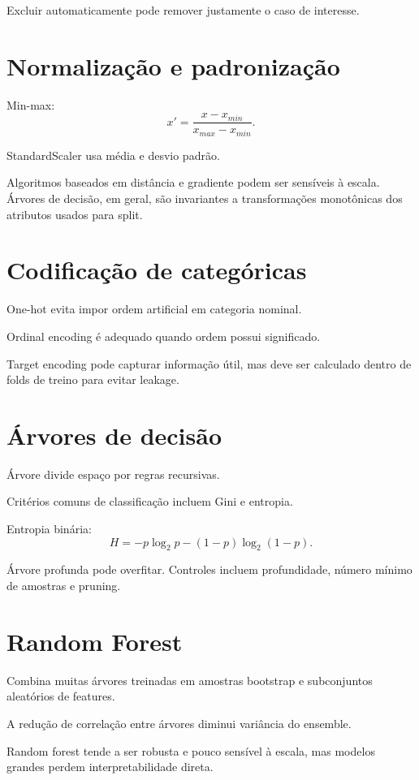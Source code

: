 Excluir automaticamente pode remover justamente o caso de interesse.

\section{Normalização e padronização}

Min-max:
\[
x'=\frac{x-x_{min}}{x_{max}-x_{min}}.
\]

StandardScaler usa média e desvio padrão.

Algoritmos baseados em distância e gradiente podem ser sensíveis à escala. Árvores de decisão, em geral, são invariantes a transformações monotônicas dos atributos usados para split.

\section{Codificação de categóricas}

One-hot evita impor ordem artificial em categoria nominal.

Ordinal encoding é adequado quando ordem possui significado.

Target encoding pode capturar informação útil, mas deve ser calculado dentro de folds de treino para evitar leakage.

\section{Árvores de decisão}

Árvore divide espaço por regras recursivas.

Critérios comuns de classificação incluem Gini e entropia.

Entropia binária:
\[
H=-p\log_2p-(1-p)\log_2(1-p).
\]

Árvore profunda pode overfitar. Controles incluem profundidade, número mínimo de amostras e pruning.

\section{Random Forest}

Combina muitas árvores treinadas em amostras bootstrap e subconjuntos aleatórios de features.

A redução de correlação entre árvores diminui variância do ensemble.

Random forest tende a ser robusta e pouco sensível à escala, mas modelos grandes perdem interpretabilidade direta.

